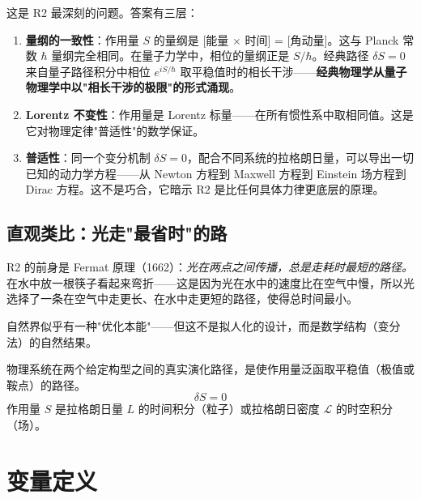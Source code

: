 这是 R2 最深刻的问题。答案有三层：

\begin{enumerate}
\item \textbf{量纲的一致性}：作用量 $S$ 的量纲是 [能量 $\times$ 时间] = [角动量]。这与 Planck 常数 $\hbar$ 量纲完全相同。在量子力学中，相位的量纲正是 $S/\hbar$。经典路径 $\delta S = 0$ 来自量子路径积分中相位 $e^{iS/\hbar}$ 取平稳值时的相长干涉——\textbf{经典物理学从量子物理学中以"相长干涉的极限"的形式涌现}。

\item \textbf{Lorentz 不变性}：作用量是 Lorentz 标量——在所有惯性系中取相同值。这是它对物理定律"普适性"的数学保证。

\item \textbf{普适性}：同一个变分机制 $\delta S = 0$，配合不同系统的拉格朗日量，可以导出一切已知的动力学方程——从 Newton 方程到 Maxwell 方程到 Einstein 场方程到 Dirac 方程。这不是巧合，它暗示 R2 是比任何具体力律更底层的原理。
\end{enumerate}

\subsection{直观类比：光走"最省时"的路}

R2 的前身是 Fermat 原理（1662）：\emph{光在两点之间传播，总是走耗时最短的路径。} 在水中放一根筷子看起来弯折——这是因为光在水中的速度比在空气中慢，所以光选择了一条在空气中走更长、在水中走更短的路径，使得总时间最小。

自然界似乎有一种"优化本能"——但这不是拟人化的设计，而是数学结构（变分法）的自然结果。

\begin{principlebox}[R2 — 最小作用量原理]
  物理系统在两个给定构型之间的真实演化路径，是使作用量泛函取平稳值（极值或鞍点）的路径。
  \[
  \delta S = 0
  \]
  作用量 $S$ 是拉格朗日量 $L$ 的时间积分（粒子）或拉格朗日密度 $\mathcal{L}$ 的时空积分（场）。
\end{principlebox}

\section{变量定义}

